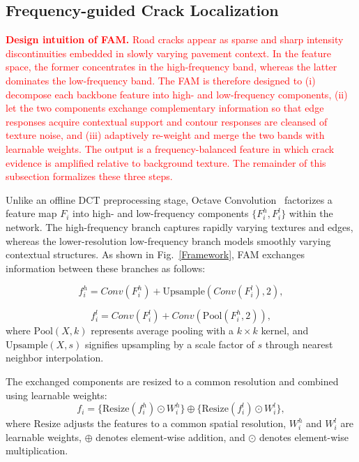 \documentclass[journal]{IEEEtran}
\begin{document}
\subsection{{Frequency-guided Crack Localization}} \label{sec:Frequency-guided-Coarse-Positioning}
\textcolor{red}{\textbf{Design intuition of FAM.} Road cracks appear as sparse and sharp intensity discontinuities embedded in slowly varying pavement context. In the feature space, the former concentrates in the high-frequency band, whereas the latter dominates the low-frequency band. The FAM is therefore designed to (i) decompose each backbone feature into high- and low-frequency components, (ii) let the two components exchange complementary information so that edge responses acquire contextual support and contour responses are cleansed of texture noise, and (iii) adaptively re-weight and merge the two bands with learnable weights. The output is a frequency-balanced feature in which crack evidence is amplified relative to background texture. The remainder of this subsection formalizes these three steps.}

Unlike an offline DCT preprocessing stage, Octave Convolution~\cite{DBLP:conf/iccv/Chen0XYKRYF19} factorizes a feature map $F_i$ into high- and low-frequency components $\{F_i^h,F_i^l\}$ within the network. The high-frequency branch captures rapidly varying textures and edges, whereas the lower-resolution low-frequency branch models smoothly varying contextual structures. As shown in Fig.~\ref{Framework}, FAM exchanges information between these branches as follows:

\begin{equation}
f^{h}_{i} = Conv(F^{h}_{i}) + \text{Upsample}(Conv(F^{l}_{i}), 2),
\end{equation}

\begin{equation}
f^{l}_{i} = Conv(F^{l}_{i}) + Conv(\text{Pool}(F^{h}_{i}, 2)),
\end{equation}
where $\text{Pool}(X, k)$ represents average pooling with a $k \times k$ kernel, and $\text{Upsample}(X, s)$ signifies upsampling by a scale factor of $s$ through nearest neighbor interpolation. 

The exchanged components are resized to a common resolution and combined using learnable weights:
\begin{equation}
f_i = \{ \text{Resize}(f^{h}_{i}) \odot W^{h}_{i} \} \oplus  \{ \text{Resize}(f^{l}_{i})  \odot W^{l}_{i}  
 \},
\end{equation}
where $\text{Resize}$ adjusts the features to a common spatial resolution, $W^{h}_{i}$ and $W^{l}_{i}$ are learnable weights, $\oplus$ denotes element-wise addition, and $\odot$ denotes element-wise multiplication.
\end{document}
